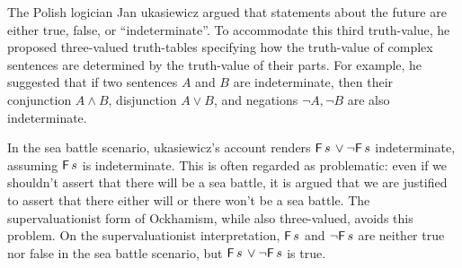 The Polish logician Jan \polishL{}ukasiewicz argued that statements about the
future are either true, false, or ``indeterminate''. To accommodate this third
truth-value, he proposed three-valued truth-tables specifying how the
truth-value of complex sentences are determined by the truth-value of their
parts. For example, he suggested that if two sentences $A$ and $B$ are
indeterminate, then their conjunction $A \land B$, disjunction $A \lor B$, and
negations $\neg A, \neg B$ are also indeterminate.

In the sea battle scenario, \polishL{}ukasiewicz's account renders
$\operatorname{\mathsf{F}} s \,\lor \neg\! \operatorname{\mathsf{F}} s$ indeterminate, assuming $\operatorname{\mathsf{F}} s$ is indeterminate. This
is often regarded as problematic: even if we shouldn't assert that there will be
a sea battle, it is argued that we are justified to assert that there either
will or there won't be a sea battle. The supervaluationist form of Ockhamism,
while also three-valued, avoids this problem. On the supervaluationist
interpretation, $\operatorname{\mathsf{F}} s$ and $\neg \!\operatorname{\mathsf{F}} s$ are neither true nor false in the sea
battle scenario, but $\operatorname{\mathsf{F}} s \,\lor \neg \!\operatorname{\mathsf{F}} s$ is true.

